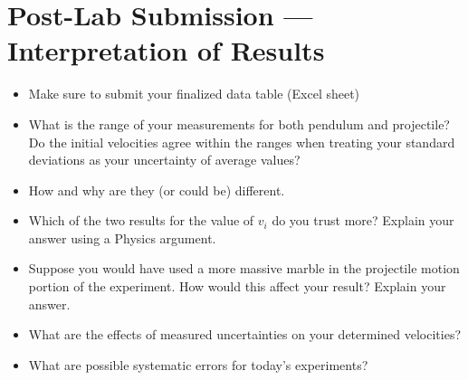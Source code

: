 \pagebreak

\section{Post-Lab Submission --- Interpretation of Results}

\begin{itemize}
    \item Make sure to submit your finalized data table (Excel sheet)
    \item What is the range of your measurements for both pendulum and projectile? Do the initial velocities agree within the ranges when treating your standard deviations as your uncertainty of average values?
    \item How and why are they (or could be) different.
    \item Which of the two results for the value of $v_i$ do you trust more? Explain your answer using a Physics argument.
    \item Suppose you would have used a more massive marble in the projectile motion portion of the experiment. How would this affect your result? Explain your answer.
    \item What are the effects of measured uncertainties on your determined velocities?
    \item What are possible systematic errors for today's experiments?
\end{itemize}









